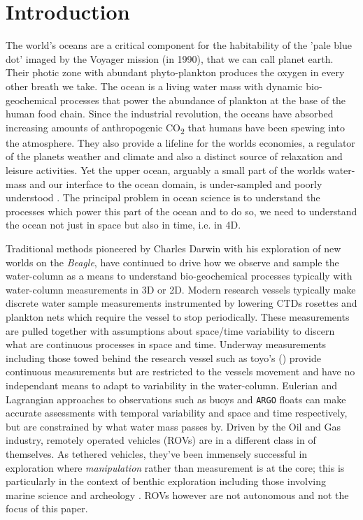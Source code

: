 \section{Introduction}

The world's oceans are a critical component for the habitability of
the 'pale blue dot' imaged by the Voyager mission (in 1990), that we
can call planet earth. Their photic zone with abundant phyto-plankton
produces the oxygen in every other breath we take. The ocean is a
living water mass with dynamic bio-geochemical processes that power
the abundance of plankton at the base of the human food chain.  Since
the industrial revolution, the oceans have absorbed increasing amounts
of anthropogenic CO\textsubscript{2} that humans have been spewing
into the atmosphere. They also provide a lifeline for the worlds
economies, a regulator of the planets weather and climate and also a
distinct source of relaxation and leisure activities. Yet the upper
ocean, arguably a small part of the worlds water-mass and our
interface to the ocean domain, is under-sampled and poorly understood
\cite{munk2002}. The principal problem in ocean science is to
understand the processes which power this part of the ocean and to do so,
we need to understand the ocean not just in space but also in time,
i.e. in 4D. 

Traditional methods pioneered by Charles Darwin with his exploration
of new worlds on the \emph{Beagle}, have continued to drive how we
observe and sample the water-column as a means to understand
bio-geochemical processes typically with water-column measurements in
3D or 2D.  Modern research vessels typically make discrete water
sample measurements instrumented by lowering CTDs rosettes and
plankton nets which require the vessel to stop periodically. These
measurements are pulled together with assumptions about space/time
variability to discern what are continuous processes in space and
time. Underway measurements including those towed behind the research
vessel such as toyo's () provide continuous measurements but
are restricted to the vessels movement and have no independant means
to adapt to variability in the water-column. Eulerian and Lagrangian
approaches to observations such as buoys and \texttt{ARGO} floats
\cite{roemmich09} can make accurate assessments with temporal
variability and space and time respectively, but are constrained by
what water mass passes by. Driven by the Oil and Gas industry,
remotely operated vehicles (ROVs) are in a different class in of
themselves. As tethered vehicles, they've been immensely successful in
exploration where \emph{manipulation} rather than measurement is at
the core; this is particularly in the context of benthic exploration
including those involving marine science \cite{yoerger00,robi17} and
archeology \cite{coleman00}. ROVs however are not autonomous and not
the focus of this paper.

